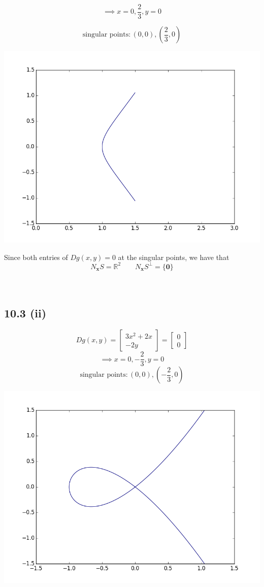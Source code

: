 \documentclass[letterpaper,12pt]{article}
\theoremstyle{definition}
\begin{document}
\[\implies x = 0, \frac{2}{3}, y = 0 \]

\[ \text{singular points}: (0,0), (\frac{2}{3},0)\]

\includegraphics[scale = .75]{3i}

Since both entries of $Dg(x,y) = 0$ at the singular points, we have that \[N_{\mathbf{x}}S = \mathbb{R}^2 \qquad N_{\mathbf{x}}S^{\perp} = \{\mathbf{0}\}\]
\\\\

\subsection*{10.3 (ii)}
\[ Dg(x,y) = \begin{bmatrix}
3x^2 + 2x \\
-2y 
\end{bmatrix}  
= \begin{bmatrix}
0 \\
0 
\end{bmatrix} \]
\[ \implies x = 0, -\frac{2}{3}, y = 0 \]
\[\text{singular points}: (0,0), (-\frac{2}{3}, 0)\]

\includegraphics[scale = .75]{3ii}
\end{document}
